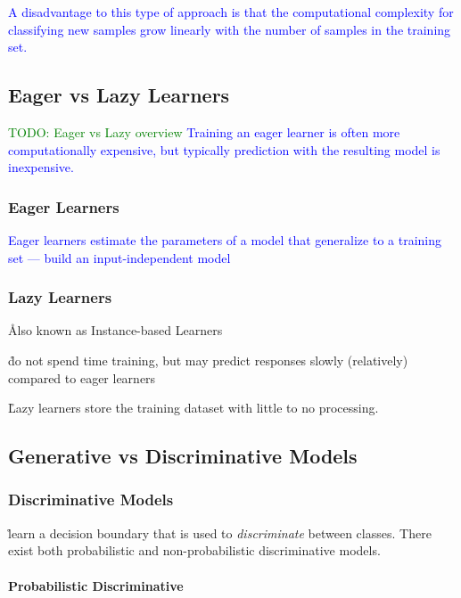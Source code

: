 \textcolor{blue}{A disadvantage to this type of approach is that the computational complexity for classifying new samples grow linearly with the number of samples in the training set.}



\subsection{Eager vs Lazy Learners}

\textcolor{green}{TODO: Eager vs Lazy overview}
\textcolor{blue}{Training an eager learner is often more computationally expensive, but typically prediction with the resulting model is inexpensive.}

\subsubsection{Eager Learners}

\textcolor{blue}{Eager learners estimate the parameters of a model that generalize to a training set --- build an input-independent model}

\subsubsection{Lazy Learners}

\r{Also known as Instance-based Learners}

\r{do not spend time training, but may predict responses slowly (relatively) compared to eager learners}

\r{Lazy learners store the training dataset with little to no processing.}


\subsection{Generative vs Discriminative Models}



\subsubsection{Discriminative Models}

\r{learn a decision boundary that is used to \textit{discriminate} between classes. There exist both probabilistic and non-probabilistic discriminative models.}

\paragraph{Probabilistic Discriminative}

